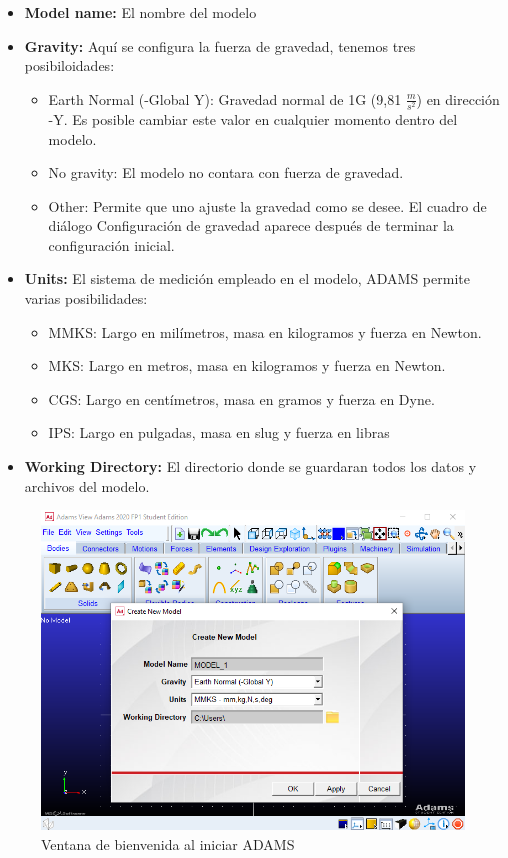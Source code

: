                 \begin{itemize}
                    \item \textbf{Model name:} El nombre del modelo
                    \item \textbf{Gravity:} Aquí se configura la fuerza de gravedad, tenemos tres posibiloidades:
                           \begin{itemize}
                               \item Earth Normal (-Global Y): Gravedad normal de 1G (9,81 $\frac{m}{s^2}$) en dirección -Y. Es posible cambiar este valor en cualquier momento dentro del modelo.
                               \item No gravity: El modelo no contara con fuerza de gravedad.
                               \item Other: Permite que uno ajuste la gravedad como se desee. El cuadro de diálogo Configuración de gravedad aparece después de terminar la configuración inicial.
                           \end{itemize}
                    \item \textbf{Units:} El sistema de medición empleado en el modelo, ADAMS permite varias posibilidades:
                        \begin{itemize}
                            \item MMKS: Largo en milímetros, masa en kilogramos y fuerza en Newton.
                            \item MKS: Largo en metros, masa en kilogramos y fuerza en Newton.
                            \item CGS: Largo en centímetros, masa en gramos y fuerza en Dyne.
                            \item IPS: Largo en pulgadas, masa en slug y fuerza en libras
                        \end{itemize}
                    \item \textbf{Working Directory:} El directorio donde se guardaran todos los datos y archivos del modelo.
                \end{itemize}
            
            \begin{figure}[H]
                \centering
                \includegraphics[width=0.7\linewidth]{Main/Chapter3/Images3/adams/ventana_configuracion_inicial.png}
                \caption{Ventana de bienvenida al iniciar ADAMS}
                \label{f:Cap3-adams_window_configuracion_inicial}
            \end{figure} 
            
